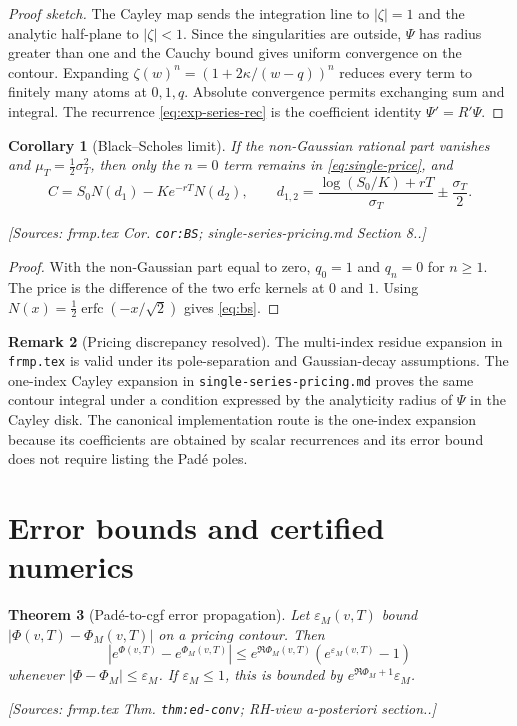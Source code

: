 \documentclass[11pt]{article}
\newtheorem{theorem}{Theorem}[section]
\newtheorem{corollary}[theorem]{Corollary}
\theoremstyle{definition}
\newtheorem{remark}[theorem]{Remark}
\newcommand{\erfc}{\operatorname{erfc}}
\newcommand{\Source}[1]{\par\smallskip\noindent\textup{[Sources: #1.]}}
\begin{document}
\begin{proof}[Proof sketch]
The Cayley map sends the integration line to $|\zeta|=1$ and the analytic half-plane to $|\zeta|<1$.
Since the singularities are outside,
$\Psi$ has radius greater than one and the Cauchy bound gives uniform convergence on the contour.
Expanding $\zeta(w)^n=(1+2\kappa/(w-q))^n$ reduces every term to finitely many atoms at $0,1,q$.
Absolute convergence permits exchanging sum and integral.
The recurrence \eqref{eq:exp-series-rec} is the coefficient identity $\Psi'=R'\Psi$.
\end{proof}

\begin{corollary}[Black--Scholes limit]\label{cor:black-scholes}
If the non-Gaussian rational part vanishes and
$\mu_T=\tfrac12\sigma_T^2$,
then only the $n=0$ term remains in \eqref{eq:single-price},
and
\begin{equation}\label{eq:bs}
        C=S_0N(d_1)-Ke^{-rT}N(d_2),
        \qquad
        d_{1,2}=\frac{\log(S_0/K)+rT}{\sigma_T}\pm\frac{\sigma_T}{2}.
\end{equation}
\Source{frmp.tex Cor. \texttt{cor:BS}; single-series-pricing.md Section 8.}
\end{corollary}

\begin{proof}
With the non-Gaussian part equal to zero,
$q_0=1$ and $q_n=0$ for $n\ge1$.
The price is the difference of the two erfc kernels at $0$ and $1$.
Using $N(x)=\tfrac12\erfc(-x/\sqrt2)$ gives \eqref{eq:bs}.
\end{proof}

\begin{remark}[Pricing discrepancy resolved]
The multi-index residue expansion in \texttt{frmp.tex} is valid under its pole-separation and Gaussian-decay assumptions.
The one-index Cayley expansion in \texttt{single-series-pricing.md} proves the same contour integral under a condition expressed by the analyticity radius of $\Psi$ in the Cayley disk.
The canonical implementation route is the one-index expansion because its coefficients are obtained by scalar recurrences and its error bound does not require listing the Padé poles.
\end{remark}

\section{Error bounds and certified numerics}

\begin{theorem}[Padé-to-cgf error propagation]\label{thm:cgf-error}
Let $\varepsilon_M(v,T)$ bound
$|\Phi(v,T)-\Phi_M(v,T)|$
on a pricing contour.
Then
\begin{equation}\label{eq:exp-error}
        |e^{\Phi(v,T)}-e^{\Phi_M(v,T)}|
        \le e^{\Re\Phi_M(v,T)}\left(e^{\varepsilon_M(v,T)}-1\right)
\end{equation}
whenever $|\Phi-\Phi_M|\le\varepsilon_M$.
If $\varepsilon_M\le1$,
this is bounded by $e^{\Re\Phi_M+1}\varepsilon_M$.
\Source{frmp.tex Thm. \texttt{thm:ed-conv}; RH-view a-posteriori section.}
\end{theorem}
\end{document}
